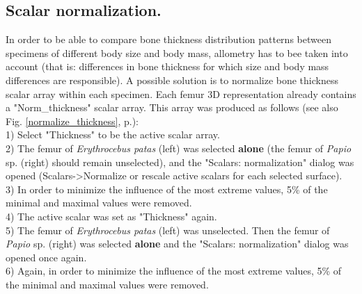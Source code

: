 \documentclass[12pt, a4paper]{book}
\begin{document}
\subsection{Scalar normalization.}
In order to be able to compare bone thickness distribution patterns between specimens of different body size and body mass, allometry has to bee taken into account  (that is: differences in bone thickness for which size and body mass differences are responsible). A possible solution is to normalize bone thickness scalar array within each specimen. 
Each femur 3D representation already contains a "Norm\_thickness" scalar array. This array was produced as follows (see also Fig. \ref{normalize_thickness}, p.\pageref{normalize_thickness}): \\
1) Select "Thickness" to be the active scalar array.\\
2) The femur of \textit{Erythrocebus patas} (left) was selected \textbf{alone} (the femur of \textit{Papio} sp. (right) should remain unselected), and the "Scalars: normalization" dialog was opened (Scalars->Normalize or rescale active scalars for each selected surface). \\
3) In order to minimize the influence of the most extreme values, 5\% of the minimal and maximal values were removed.\\
4) The active scalar was set as "Thickness" again. \\
5) The femur of \textit{Erythrocebus patas} (left) was unselected. Then the femur of \textit{Papio} sp. (right) was selected \textbf{alone} and the "Scalars: normalization" dialog was opened once again. \\
6) Again, in order to minimize the influence of the most extreme values, 5\% of the minimal and maximal values were removed.\\
\end{document}
